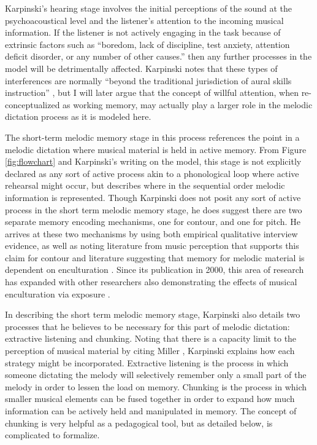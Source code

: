 \documentclass[12pt,]{book}
\begin{document}
Karpinski's hearing stage involves the initial perceptions of the sound at the psychoacoustical level and the listener's attention to the incoming musical information.
If the listener is not actively engaging in the task because of extrinsic factors such as ``boredom, lack of discipline, test anxiety, attention deficit disorder, or any number of other causes.'' \citep[p.65]{karpinskiAuralSkillsAcquisition2000} then any further processes in the model will be detrimentally affected.
Karpinski notes that these types of interferences are normally ``beyond the traditional jurisdiction of aural skills instruction'' \citep[p.65]{karpinskiAuralSkillsAcquisition2000}, but I will later argue that the concept of willful attention, when re-conceptualized as working memory, may actually play a larger role in the melodic dictation process as it is modeled here.

The short-term melodic memory stage in this process references the point in a melodic dictation where musical material is held in active memory.
From Figure \ref{fig:flowchart} and Karpinski's writing on the model, this stage is not explicitly declared as any sort of active process akin to a phonological loop \citep{baddeleyEpisodicBufferNew2000} where active rehearsal might occur, but describes where in the sequential order melodic information is represented.
Though Karpinski does not posit any sort of active process in the short term melodic memory stage, he does suggest there are two separate memory encoding mechanisms, one for contour, and one for pitch.
He arrives at these two mechanisms by using both empirical qualitative interview evidence, as well as noting literature from music perception that supports this claim for contour \citep{dowlingScaleContourTwo1978, dewittRecognitionNovelMelodies1986} and literature suggesting that memory for melodic material is dependent on enculturation \citep{ouraMemoryMelodiesSubjects1988, handelListeningIntroductionPerception1989, dowlingExpectancyAttentionMelody1990}.
Since its publication in 2000, this area of research has expanded with other researchers also demonstrating the effects of musical enculturation via exposure \citep{eerolaExpectancySamiYoiks2009, stevensMusicPerceptionCognition2012, pearceAuditoryExpectationInformation2012, pearceStatisticalLearningProbabilistic2018a}.

In describing the short term melodic memory stage, Karpinski also details two processes that he believes to be necessary for this part of melodic dictation: extractive listening and chunking.
Noting that there is a capacity limit to the perception of musical material by citing Miller \citeyearpar{millerMagicalNumberSeven1956}, Karpinski explains how each strategy might be incorporated.
Extractive listening is the process in which someone dictating the melody will selectively remember only a small part of the melody in order to lessen the load on memory.
Chunking is the process in which smaller musical elements can be fused together in order to expand how much information can be actively held and manipulated in memory.
The concept of chunking is very helpful as a pedagogical tool, but as detailed below, is complicated to formalize.
\end{document}
